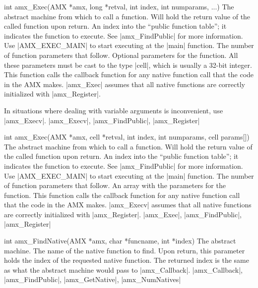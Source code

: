 \syntaxp int amx_Exec(AMX *amx, long *retval, int index, int numparams, ...)
        The abstract machine from which to call a function.
        Will hold the return value of the called function upon return.
        An index into the ``public function table''; it indicates the
        function to execute. See |amx_FindPublic| for more information.
        Use |AMX_EXEC_MAIN| to start executing at the |main| function.
        The number of function parameters that follow.
        Optional parameters for the function. All these parameters must
        be cast to the type |cell|, which is usually a 32-bit integer.
\notes
    This function calls the callback function for any native function call
    that the code in the AMX makes. |amx_Exec| assumes that all native
    functions are correctly initialized with |amx_Register|.

    In situations where dealing with variable arguments is inconvenient, use
    |amx_Execv|.
\seealso |amx_Execv|, |amx_FindPublic|, |amx_Register|

\syntaxp int amx_Exec(AMX *amx, cell *retval, int index, int numparams, cell params[])
        The abstract machine from which to call a function.
        Will hold the return value of the called function upon return.
        An index into the ``public function table''; it indicates the
        function to execute. See |amx_FindPublic| for more information.
        Use |AMX_EXEC_MAIN| to start executing at the |main| function.
        The number of function parameters that follow.
        An array with the parameters for the function.
\notes
    This function calls the callback function for any native function call
    that the code in the AMX makes. |amx_Execv| assumes that all native
    functions are correctly initialized with |amx_Register|.
\seealso |amx_Exec|, |amx_FindPublic|, |amx_Register|

\syntaxp int amx_FindNative(AMX *amx, char *funcname, int *index)
        The abstract machine.
        The name of the native function to find.
        Upon return, this parameter holds the index of the requested native
        function.
\notes
    The returned index is the same as what the abstract machine would pass to
    |amx_Callback|.
\seealso
    |amx_Callback|, |amx_FindPublic|, |amx_GetNative|, \lbreak
    |amx_NumNatives|

